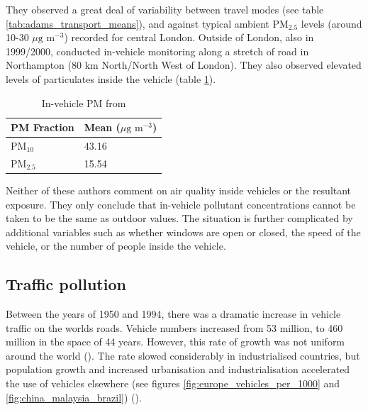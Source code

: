 They observed a great deal of variability between travel modes (see table \ref{tab:adams_transport_means}), and against typical ambient PM$_{2.5}$ levels (around 10-30 $\mu \text{g m}^{-3}$) recorded for central London. Outside of London, also in 1999/2000, \cite{Gulliver2004} conducted in-vehicle monitoring along a stretch of road in Northampton (80 km North/North West of London). They also observed elevated levels of particulates inside the vehicle (table \ref{tab:gulliver_vehicle_means}).

\begin{table}[H]
\centering
    \begin{tabular}{ | l | l |}
    \hline 
     \bfseries{PM Fraction} & \bfseries{Mean ($\mu \text{g m}^{-3}$)} \\ \hline
     PM$_{10}$ & 43.16\\ \hline
     PM$_{2.5}$ & 15.54\\ \hline
    \end{tabular}
\caption{In-vehicle PM from \cite{Gulliver2004}}
\label{tab:gulliver_vehicle_means}
\end{table}

Neither of these authors comment on air quality inside vehicles or the resultant exposure. They only conclude that in-vehicle pollutant concentrations cannot be taken to be the same as outdoor values. The situation is further complicated by additional variables such as whether windows are open or closed, the speed of the vehicle, or the number of people inside the vehicle.


\subsection{Traffic pollution}
\label{subsec:trafficpollution}

Between the years of 1950 and 1994, there was a dramatic increase in vehicle traffic on the worlds roads.  Vehicle numbers increased from 53 million, to 460 million in the space of 44 years. However, this rate of growth was not uniform around the world (\cite{schwela2002}). The rate slowed considerably in industrialised countries, but population growth and increased urbanisation and industrialisation accelerated the use of vehicles elsewhere (see figures \ref{fig:europe_vehicles_per_1000} and \ref{fig:china_malaysia_brazil}) (\cite{DepartmentforTransport2012}).

